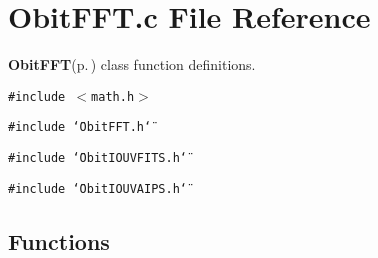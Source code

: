 \section{Obit\-FFT.c File Reference}
\label{ObitFFT_8c}
{\bf Obit\-FFT}{\rm (p.\,\pageref{structObitFFT})} class function definitions. 

{\tt \#include $<$math.h$>$}\par
{\tt \#include \char`\"{}Obit\-FFT.h\char`\"{}}\par
{\tt \#include \char`\"{}Obit\-IOUVFITS.h\char`\"{}}\par
{\tt \#include \char`\"{}Obit\-IOUVAIPS.h\char`\"{}}\par
\subsection*{Functions}
